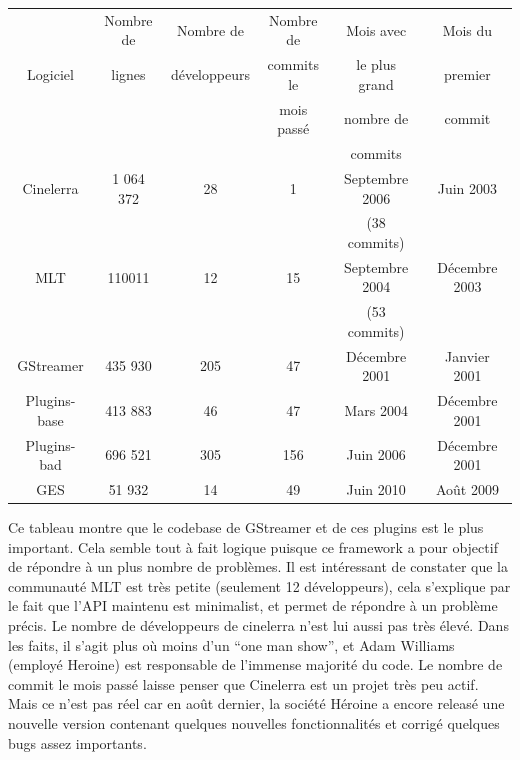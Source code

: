 \begin{center}

  \begin{tabular}{ | c | c | c | c |c| c |}

    \hline

         &Nombre de& Nombre de & Nombre de&Mois avec& Mois du \\

Logiciel &lignes & développeurs& commits le&le plus grand & premier\\

         &&&mois passé&nombre de&commit\\

         &&&&commits&\\

\hline \hline

Cinelerra&1 064 372 &28&1& Septembre 2006&Juin 2003\\

&&&&(38 commits)&\\ \hline

MLT\index{MLT}& 110011 &12&15& Septembre 2004&Décembre 2003\\

&&&&(53 commits)& \\ \hline

GStreamer& 435 930  &205&47& Décembre 2001&Janvier 2001\\

Plugins-base& 413 883 &46&47& Mars 2004&Décembre 2001\\

Plugins-bad& 696 521 &305&156& Juin 2006&Décembre 2001\\

GES& 51 932 &14&49& Juin 2010&Août 2009\\

\hline

  \end{tabular}

\end{center}

Ce tableau montre que le codebase de GStreamer et de ces plugins est le
plus important. Cela semble tout à fait logique puisque ce framework
a pour objectif de répondre à un plus nombre de problèmes. Il est
intéressant de constater que la communauté MLT est très
petite (seulement 12 développeurs), cela s'explique par le fait que
l'API maintenu est minimalist, et permet de répondre à un problème
précis.  Le nombre de développeurs de cinelerra n'est lui aussi pas
très élevé. Dans les faits, il s'agit plus où moins d'un ``one man
show'', et Adam Williams (employé Heroine) est responsable de l'immense
majorité du code. Le nombre de commit le mois passé laisse penser que
Cinelerra est un projet très peu actif. Mais ce n'est pas réel car
en août dernier, la société Héroine a encore releasé une nouvelle
version contenant quelques nouvelles fonctionnalités et corrigé quelques
bugs assez importants.

